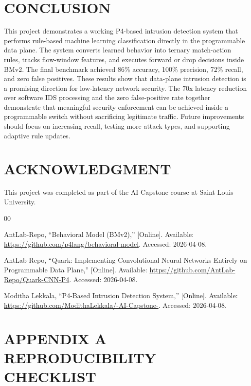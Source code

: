 \documentclass[conference]{IEEEtran}
\begin{document}
\section{CONCLUSION}

This project demonstrates a working P4-based intrusion
detection system that performs rule-based machine learning
classification directly in the programmable data plane. The
system converts learned behavior into ternary match-action
rules, tracks flow-window features, and executes forward or
drop decisions inside BMv2. The final benchmark achieved
86\% accuracy, 100\% precision, 72\% recall, and zero false
positives. These results show that data-plane intrusion
detection is a promising direction for low-latency network
security. The 70x latency reduction over software IDS
processing and the zero false-positive rate together
demonstrate that meaningful security enforcement can be
achieved inside a programmable switch without sacrificing
legitimate traffic. Future improvements should focus on
increasing recall, testing more attack types, and supporting
adaptive rule updates.

\section*{ACKNOWLEDGMENT}

This project was completed as part of the AI Capstone
course at Saint Louis University.

\begin{thebibliography}{00}

AntLab-Repo,
``Behavioral Model (BMv2),''
[Online]. Available:
\url{https://github.com/p4lang/behavioral-model}.
Accessed: 2026-04-08.

AntLab-Repo,
``Quark: Implementing Convolutional Neural Networks Entirely on Programmable Data Plane,''
[Online]. Available:
\url{https://github.com/AntLab-Repo/Quark-CNN-P4}.
Accessed: 2026-04-08.

Moditha Lekkala,
``P4-Based Intrusion Detection System,''
[Online]. Available:
\url{https://github.com/ModithaLekkala/-AI-Capstone-}.
Accessed: 2026-04-08.

\end{thebibliography}

\clearpage

\appendices

\clearpage
\onecolumn

\section*{APPENDIX A\\REPRODUCIBILITY CHECKLIST}
\end{document}
